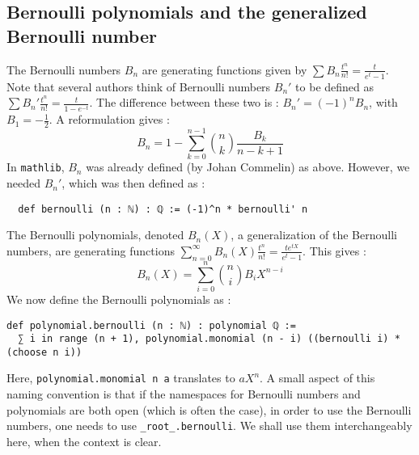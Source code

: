 \documentclass[a4paper,UKenglish,cleveref, autoref, thm-restate]{lipics-v2021}
\newcommand{\lean}[1]{\texttt{#1}\xspace} %
\begin{document}
\subsection{Bernoulli polynomials and the generalized Bernoulli number}
The Bernoulli numbers $B_n$ are generating functions given by $\sum B_n\frac{t^n}{n!}=\frac{t}{e^{t} - 1}$. 
Note that several authors think of Bernoulli numbers $B_n'$ to be defined as $\sum B_n'\frac{t^n}{n!}=\frac{t}{1-e^{-t}}$. 
The difference between these two is : $B_n' = (-1)^n B_n$, with $B_1 = - \frac{1}{2}$.
A reformulation gives :
$$ B_n = 1 - \sum_{k = 0}^{n - 1} {n \choose k} \frac{B_k}{n - k + 1} $$
In \lean{mathlib}, $B_n$ was already defined (by Johan Commelin) as above. However, we needed $B_n'$, which was then defined as :
\begin{lstlisting}
  def bernoulli (n : ℕ) : ℚ := (-1)^n * bernoulli' n
\end{lstlisting}
The Bernoulli polynomials, denoted $B_n(X)$, a generalization of the Bernoulli numbers,
are generating functions $ \sum_{n = 0}^{\infty} B_n(X) \frac{t^n}{n!} = \frac{t e^{tX}}{e^t - 1} $. 
This gives :
$$ B_n (X) = \sum_{i = 0}^n {n \choose i} B_i X^{n - i} $$
We now define the Bernoulli polynomials as : \newpage
\begin{lstlisting}
def polynomial.bernoulli (n : ℕ) : polynomial ℚ :=
  ∑ i in range (n + 1), polynomial.monomial (n - i) ((bernoulli i) * (choose n i))
\end{lstlisting}
Here, \lean{polynomial.monomial n a} translates to $a X^n$. A small aspect of this 
naming convention is that if the namespaces for Bernoulli numbers and polynomials are both open 
(which is often the case), in order to use the Bernoulli numbers, one needs to use \lean{\_root\_.bernoulli}. 
We shall use them interchangeably here, when the context is clear. 
\end{document}
